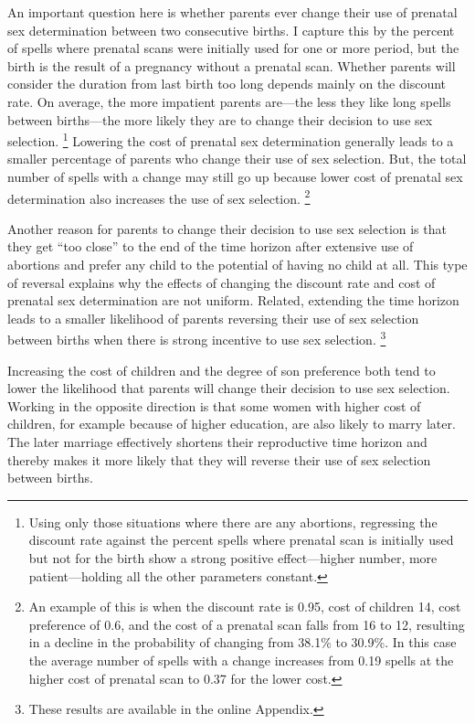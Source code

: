 \documentclass[12pt,letterpaper]{article}
\begin{document}

An important question here is whether parents ever
change their use of prenatal sex determination between
two consecutive births.
I capture this by the percent of spells where prenatal
scans were initially used for one or more period, but the birth
is the result of a pregnancy without a prenatal scan.
Whether parents will consider the duration from last birth too long 
depends mainly on the discount rate.
On average, the more impatient parents are---the less they
like long spells between births---the more likely they are to
change their decision to use sex selection.%
\footnote{
Using only those situations where there are any abortions,
regressing the discount rate against the percent spells where
prenatal scan is initially used but not for the birth show
a strong positive effect---higher number, more patient---holding
all the other parameters constant.
}
Lowering the cost of prenatal sex determination generally leads to 
a smaller percentage of parents who change their use of sex selection.
But, the total number of spells with a change may still
go up because lower cost of prenatal sex determination also
increases the use of sex selection.%
\footnote{
An example of this is when the discount rate is 0.95, cost of
children 14, cost preference of 0.6, and the cost of a prenatal scan falls 
from 16 to 12, resulting in a decline in the probability of changing 
from 38.1\% to 30.9\%.
In this case the average number of spells with a change increases
from 0.19 spells at the higher cost of prenatal scan 
to 0.37 for the lower cost.
}

Another reason for parents to change their decision to use sex
selection is that they get ``too close'' to the end of the time
horizon after extensive use of abortions and prefer any child to 
the potential of having no child at all.
This type of reversal explains why the effects of changing the discount 
rate and cost of prenatal sex determination are not uniform.
Related, extending the time horizon leads to a smaller likelihood of parents 
reversing their use of sex selection between births when
there is strong incentive to use sex selection.%
\footnote{
These results are available in the online Appendix.
}

Increasing the cost of children and the degree of son preference
both tend to lower the likelihood that parents will change their
decision to use sex selection.
Working in the opposite direction is that some women with higher cost
of children, for example because of higher education, are also likely 
to marry later.
The later marriage effectively shortens their reproductive time horizon
and thereby makes it more likely that they will reverse their use of 
sex selection between births.
\end{document}
